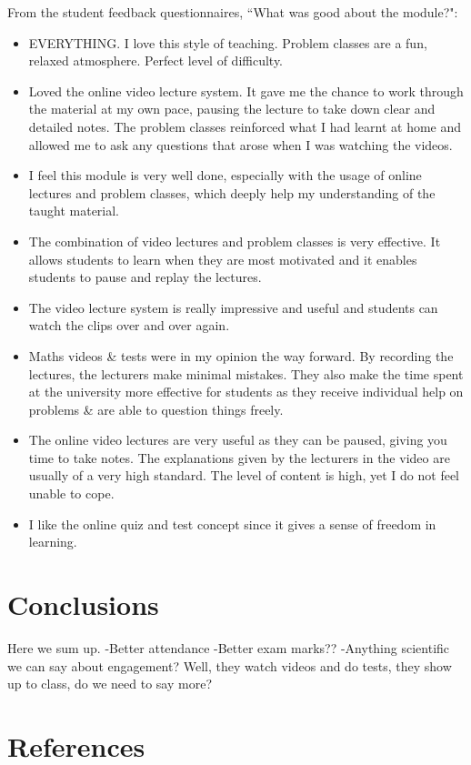 \documentclass{amsart}
\begin{document}
From the student feedback questionnaires, ``What was good about the module?":
\begin{itemize}
\item EVERYTHING. I love this style of teaching. Problem classes are a fun, relaxed atmosphere. Perfect level of difficulty.
\item Loved the online video lecture system. It gave me the chance to work through the material at my own pace,
pausing the lecture to take down clear and detailed notes. The problem classes reinforced what I had learnt at
home and allowed me to ask any questions that arose when I was watching the videos.
\item I feel this module is very well done, especially with the usage of online lectures and problem classes, which deeply help my understanding of the taught material.
\item The combination of video lectures and problem classes is very effective. It allows students to learn when they
are most motivated and it enables students to pause and replay the lectures.
\item The video lecture system is really impressive and useful and students can watch the clips over and over again.
\item Maths videos \& tests were in my opinion the way forward. By recording the lectures, the lecturers make minimal
mistakes. They also make the time spent at the university more effective for students as they receive individual
help on problems \& are able to question things freely.
\item The online video lectures are very useful as they can be paused, giving you time to take notes. The explanations
given by the lecturers in the video are usually of a very high standard. The level of content is high, yet I do not
feel unable to cope.
\item I like the online quiz and test concept since it gives a sense of freedom in learning.
\end{itemize}

\section{Conclusions}
Here we sum up.
-Better attendance
-Better exam marks??
-Anything scientific we can say about engagement? Well, they watch videos and do tests, they show up to class, do we need to say more?

\section{References}
\end{document}
